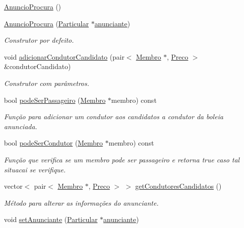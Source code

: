 \begin{DoxyCompactItemize}
\item 
\hyperlink{class_anuncio_procura_af0d631aecbb747fb64ad8a80f50944b0}{Anuncio\+Procura} ()
\item 
\hyperlink{class_anuncio_procura_a03743cdc7492d168d554b8dcd56982aa}{Anuncio\+Procura} (\hyperlink{class_particular}{Particular} $\ast$\hyperlink{class_anuncio_a58250bfc8ab82d4308839b1e26213a0f}{anunciante})
\begin{DoxyCompactList}\small\item\em Construtor por defeito. \end{DoxyCompactList}\item 
void \hyperlink{class_anuncio_procura_a1aede1a94eb45ff994d537379091077c}{adicionar\+Condutor\+Candidato} (pair$<$ \hyperlink{class_membro}{Membro} $\ast$, \hyperlink{class_preco}{Preco} $>$ \&condutor\+Candidato)
\begin{DoxyCompactList}\small\item\em Construtor com parâmetros. \end{DoxyCompactList}\item 
bool \hyperlink{class_anuncio_procura_aab615cb1457ec3784d55149d44cdc458}{pode\+Ser\+Passageiro} (\hyperlink{class_membro}{Membro} $\ast$membro) const 
\begin{DoxyCompactList}\small\item\em Função para adicionar um condutor aos candidatos a condutor da boleia anunciada. \end{DoxyCompactList}\item 
bool \hyperlink{class_anuncio_procura_aa7689f1ae7175e99b144c48422231e17}{pode\+Ser\+Condutor} (\hyperlink{class_membro}{Membro} $\ast$membro) const 
\begin{DoxyCompactList}\small\item\em Função que verifica se um membro pode ser passageiro e retorna true caso tal situacai se verifique. \end{DoxyCompactList}\item 
vector$<$ pair$<$ \hyperlink{class_membro}{Membro} $\ast$, \hyperlink{class_preco}{Preco} $>$ $>$ \hyperlink{class_anuncio_procura_a8149478f041f545ce8ccb8958d39cfbd}{get\+Condutores\+Candidatos} ()
\begin{DoxyCompactList}\small\item\em Método para alterar as informações do anunciante. \end{DoxyCompactList}\item 
void \hyperlink{class_anuncio_procura_a303be648c388693e6b92e6bf467c06ff}{set\+Anunciante} (\hyperlink{class_particular}{Particular} $\ast$\hyperlink{class_anuncio_a58250bfc8ab82d4308839b1e26213a0f}{anunciante})

\end{DoxyCompactItemize}
